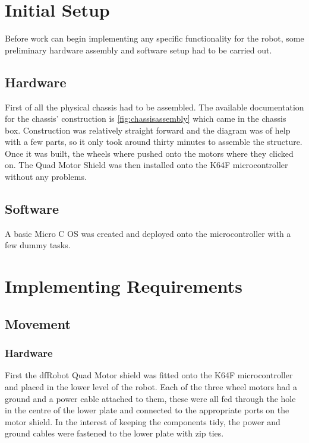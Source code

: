 		\section{Initial Setup}
		Before work can begin implementing any specific functionality for the robot, some preliminary hardware assembly and software setup had to be carried out.
			
			\subsection{Hardware}
			First of all the physical chassis had to be assembled. The available documentation for the chassis' construction is \ref{fig:chassisassembly} which came in the chassis box. Construction was relatively straight forward and the diagram was of help with a few parts, so it only took around thirty minutes to assemble the structure. Once it was built, the wheels where pushed onto the motors where they clicked on. The Quad Motor Shield was then installed onto the K64F microcontroller without any problems.
				
			\subsection{Software}
			A basic Micro C OS was created and deployed onto the microcontroller with a few dummy tasks.
			
		\section{Implementing Requirements}
			\subsection{Movement}
				\subsubsection{Hardware}
				First the dfRobot Quad Motor shield was fitted onto the K64F microcontroller and placed in the lower level of the robot. Each of the three wheel motors had a ground and a power cable attached to them, these were all fed through the hole in the centre of the lower plate and connected to the appropriate ports on the motor shield. In the interest of keeping the components tidy, the power and ground cables were fastened to the lower plate with zip ties.
				
